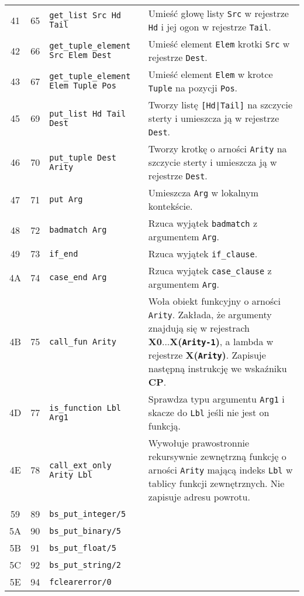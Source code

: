 \begin{longtable}{|c|c|p{5cm}|p{7cm}|}
\hline
41 & 65 & \texttt{get\_list Src Hd Tail} & Umieść głowę listy \texttt{Src} w rejestrze \texttt{Hd} i jej ogon w rejestrze \texttt{Tail}. \\
42 & 66 & \texttt{get\_tuple\_element Src Elem Dest} & Umieść element \texttt{Elem} krotki \texttt{Src} w rejestrze \texttt{Dest}.\\
\hline
43 & 67 & \texttt{get\_tuple\_element Elem Tuple Pos} & Umieść element \texttt{Elem} w krotce \texttt{Tuple} na pozycji \texttt{Pos}.\\
\hline
45 & 69 & \texttt{put\_list Hd Tail Dest} & Tworzy listę \texttt{[Hd|Tail]} na szczycie sterty i umieszcza ją w rejestrze \texttt{Dest}.\\
\hline
46 & 70 & \texttt{put\_tuple Dest Arity} & Tworzy krotkę o arności \texttt{Arity} na szczycie sterty i umieszcza ją w rejestrze \texttt{Dest}.\\
\hline
47 & 71 & \texttt{put Arg} & Umieszcza \texttt{Arg} w lokalnym kontekście.\\
\hline
48 & 72 & \texttt{badmatch Arg} & Rzuca wyjątek \texttt{badmatch} z argumentem \texttt{Arg}.\\
\hline
49 & 73 & \texttt{if\_end} & Rzuca wyjątek \texttt{if\_clause}.\\
\hline
4A & 74 & \texttt{case\_end Arg} & Rzuca wyjątek \texttt{case\_clause} z argumentem \texttt{Arg}.\\
\hline
4B & 75 & \texttt{call\_fun Arity} & Woła obiekt funkcyjny o arności \texttt{Arity}. Zakłada, że argumenty znajdują się w rejestrach \textbf{X0}...\textbf{X(\texttt{Arity-1})}, a lambda w rejestrze \textbf{X(\texttt{Arity})}. Zapisuje następną instrukcję we wskaźniku \textbf{CP}.\\
\hline
4D & 77 & \texttt{is\_function Lbl Arg1} & Sprawdza typu argumentu \texttt{Arg1} i skacze do \texttt{Lbl} jeśli nie jest on funkcją.\\
\hline
4E & 78 & \texttt{call\_ext\_only Arity Lbl} & Wywołuje prawostronnie rekursywnie zewnętrzną funkcję o arności \texttt{Arity} mającą indeks \texttt{Lbl} w tablicy funkcji zewnętrznych. Nie zapisuje adresu powrotu.\\
\hline
59 & 89 & \texttt{bs\_put\_integer/5} & \\
\hline
5A & 90 & \texttt{bs\_put\_binary/5} & \\
\hline
5B & 91 & \texttt{bs\_put\_float/5} & \\
\hline
5C & 92 & \texttt{bs\_put\_string/2} & \\
\hline
5E & 94 & \texttt{fclearerror/0} & \\

\end{longtable}
